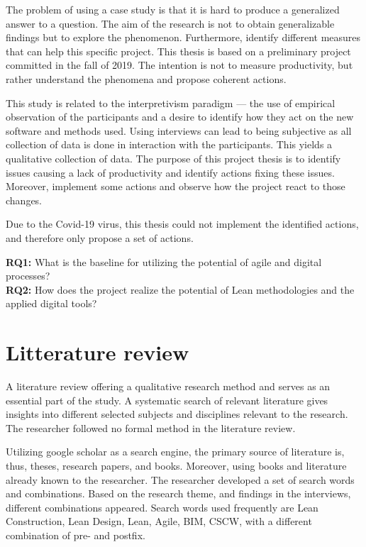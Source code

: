 The problem of using a case study is that it is hard to produce a generalized answer to a question. The aim of the research is not to obtain generalizable findings but to explore the phenomenon. Furthermore, identify different measures that can help this specific project. This thesis is based on a preliminary project committed in the fall of 2019. The intention is not to measure productivity, but rather understand the phenomena and propose coherent actions.

This study is related to the interpretivism paradigm — the use of empirical observation of the participants and a desire to identify how they act on the new software and methods used. Using interviews can lead to being subjective as all collection of data is done in interaction with the participants. This yields a qualitative collection of data. The purpose of this project thesis is to identify issues causing a lack of productivity and identify actions fixing these issues. Moreover, implement some actions and observe how the project react to those changes. 

Due to the Covid-19 virus, this thesis could not implement the identified actions, and therefore only propose a set of actions.

{\noindent \bf RQ1:} What is the baseline for utilizing the potential of agile and digital processes? \\
{\bf RQ2:} How does the project realize the potential of Lean methodologies and the applied digital tools?

\section{Litterature review}
A literature review offering a qualitative research method and serves as an essential part of the study. A systematic search of relevant literature gives insights into different selected subjects and disciplines relevant to the research. The researcher followed no formal method in the literature review.

Utilizing google scholar as a search engine, the primary source of literature is, thus, theses, research papers, and books. Moreover, using books and literature already known to the researcher. The researcher developed a set of search words and combinations. Based on the research theme, and findings in the interviews, different combinations appeared. Search words used frequently are Lean Construction, Lean Design, Lean, Agile, BIM, CSCW, with a different combination of pre- and postfix. 

